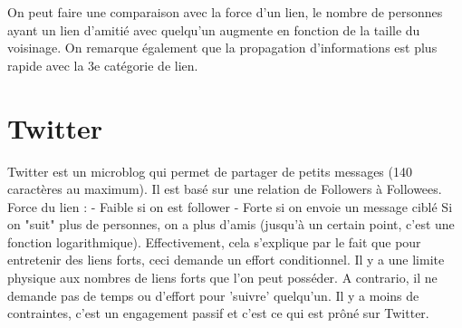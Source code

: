 On peut faire une comparaison avec la force d'un lien, le nombre de personnes ayant un lien d'amitié avec quelqu'un augmente en fonction de la taille du voisinage. 
On remarque également que la propagation d'informations est plus rapide avec la 3e catégorie de lien.
\newline
\section{Twitter}
Twitter est un microblog qui permet de partager de petits messages (140 caractères au maximum). Il est basé sur une relation de Followers à Followees.
Force du lien :
- Faible si on est follower
- Forte si on envoie un message ciblé
Si on "suit" plus de personnes, on a plus d'amis (jusqu'à un certain point, c'est une fonction logarithmique). Effectivement, cela s'explique par le fait que pour entretenir des liens forts, ceci demande un effort conditionnel. Il y a une limite physique aux nombres de liens forts que l'on peut posséder. A contrario, il ne demande pas de temps ou d'effort pour 'suivre' quelqu'un. Il y a moins de contraintes, c'est un engagement passif et c'est ce qui est prôné sur Twitter.